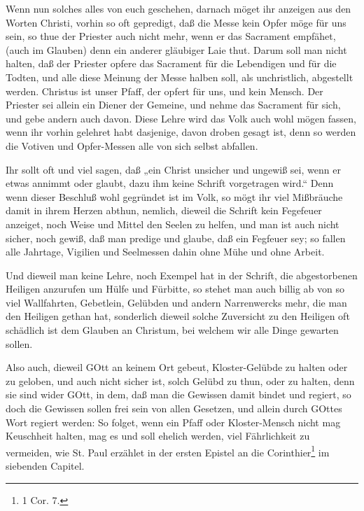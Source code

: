 Wenn nun solches alles von euch geschehen, darnach möget ihr anzeigen aus den Worten Christi, vorhin so oft gepredigt, daß die Messe kein Opfer möge für uns sein, so thue der Priester auch nicht mehr, wenn er das Sacrament empfähet, (auch im Glauben) denn ein anderer gläubiger Laie thut. Darum soll man nicht halten, daß der Priester opfere das Sacrament für die Lebendigen und für die Todten, und alle diese Meinung der Messe halben soll, als unchristlich, abgestellt werden. Christus ist unser Pfaff, der opfert für uns, und kein Mensch. Der Priester sei allein ein Diener der Gemeine, und nehme das Sacrament für sich, und gebe andern auch davon. Diese Lehre wird das Volk auch wohl mögen fassen, wenn ihr vorhin gelehret habt dasjenige, davon droben gesagt ist, denn so werden die Votiven und Opfer-Messen alle von sich selbst abfallen.

Ihr sollt oft und viel sagen, daß „ein Christ unsicher und ungewiß sei, wenn er etwas annimmt oder glaubt, dazu ihm keine Schrift vorgetragen wird.“ Denn wenn dieser Beschluß wohl gegründet ist im Volk, so mögt ihr viel Mißbräuche damit in ihrem Herzen abthun, nemlich, dieweil die Schrift kein Fegefeuer anzeiget, noch Weise und Mittel den Seelen zu helfen, und man ist auch nicht sicher, noch
gewiß, daß man predige und glaube, daß ein Fegfeuer sey; so fallen alle Jahrtage, Vigilien und Seelmessen dahin ohne Mühe und ohne Arbeit.

Und dieweil man keine Lehre, noch Exempel hat in der Schrift, die abgestorbenen Heiligen anzurufen um Hülfe und Fürbitte, so stehet man auch billig ab von so viel Wallfahrten, Gebetlein, Gelübden und andern Narrenwercks mehr, die man den Heiligen gethan hat, sonderlich dieweil solche Zuversicht zu den Heiligen oft schädlich ist dem Glauben an Christum, bei welchem wir alle Dinge gewarten sollen.

Also auch, dieweil GOtt an keinem Ort gebeut, Kloster-Gelübde zu halten oder zu geloben, und auch nicht sicher ist, solch Gelübd zu thun, oder zu halten, denn sie sind wider GOtt, in dem, daß man die Gewissen damit bindet und regiert, so doch die Gewissen sollen frei sein von allen Gesetzen, und allein durch GOttes Wort regiert werden: So folget, wenn ein Pfaff oder Kloster-Mensch nicht mag Keuschheit halten, mag es und soll ehelich werden, viel Fährlichkeit zu vermeiden, wie St. Paul erzählet in der ersten Epistel an die Corinthier\footnote{1 Cor. 7.} im siebenden Capitel.

